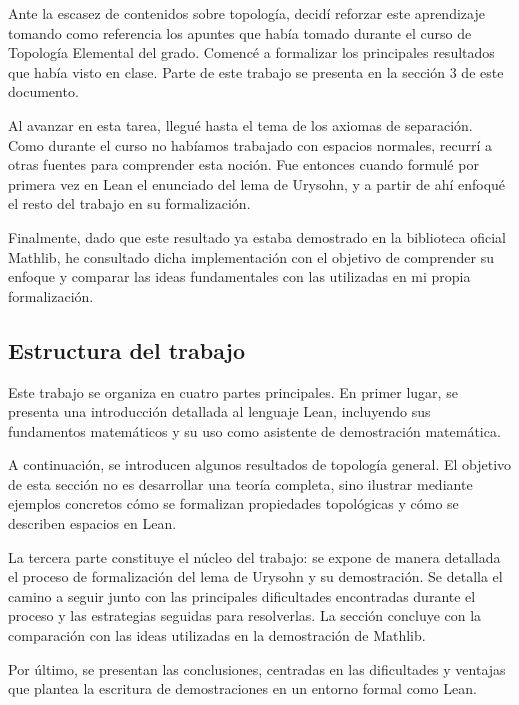 Ante la escasez de contenidos sobre topología, decidí reforzar este aprendizaje tomando como referencia los apuntes que había tomado durante el curso de Topología Elemental del grado. Comencé a formalizar los principales resultados que había visto en clase. Parte de este trabajo se presenta en la sección 3 de este documento.

Al avanzar en esta tarea, llegué hasta el tema de los axiomas de separación. Como durante el curso no habíamos trabajado con espacios normales, recurrí a otras fuentes para comprender esta noción. Fue entonces cuando formulé por primera vez en Lean el enunciado del lema de Urysohn, y a partir de ahí enfoqué el resto del trabajo en su formalización.

Finalmente, dado que este resultado ya estaba demostrado en la biblioteca oficial Mathlib, he consultado dicha implementación con el objetivo de comprender su enfoque y comparar las ideas fundamentales con las utilizadas en mi propia formalización.

\subsection{Estructura del trabajo}

Este trabajo se organiza en cuatro partes principales. En primer lugar, se presenta una introducción detallada al lenguaje Lean, incluyendo sus fundamentos matemáticos y su uso como asistente de demostración matemática.

A continuación, se introducen algunos resultados de topología general. El objetivo de esta sección no es desarrollar una teoría completa, sino ilustrar mediante ejemplos concretos cómo se formalizan propiedades topológicas y cómo se describen espacios en Lean.

La tercera parte constituye el núcleo del trabajo: se expone de manera detallada el proceso de formalización del lema de Urysohn y su demostración. Se detalla el camino a seguir junto con las principales dificultades encontradas durante el proceso y las estrategias seguidas para resolverlas. La sección concluye con la comparación con las ideas utilizadas en la demostración de Mathlib.

Por último, se presentan las conclusiones, centradas en las dificultades y ventajas que plantea la escritura de demostraciones en un entorno formal como Lean.